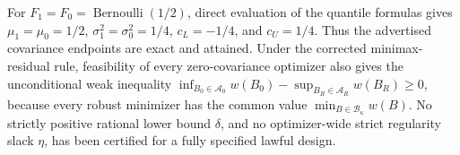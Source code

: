 For \(F_1=F_0=\operatorname{Bernoulli}(1/2)\), direct evaluation of the quantile formulas gives \(\mu_1=\mu_0=1/2\), \(\sigma_1^2=\sigma_0^2=1/4\), \(c_L=-1/4\), and \(c_U=1/4\).  Thus the advertised covariance endpoints are exact and attained.  Under the corrected minimax-residual rule, feasibility of every zero-covariance optimizer also gives the unconditional weak inequality \(\inf_{B_0\in\mathcal A_0}w(B_0)-\sup_{B_R\in\mathcal A_R}w(B_R)\ge0\), because every robust minimizer has the common value \(\min_{B\in\mathcal B_\kappa}w(B)\).  No strictly positive rational lower bound \(\delta\), and no optimizer-wide strict regularity slack \(\eta\), has been certified for a fully specified lawful design.